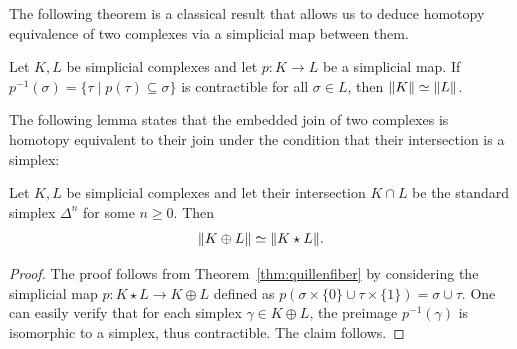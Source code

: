 \documentclass[a4paper, v2021]{lipics-v2021}
\theoremstyle{plain}
\theoremstyle{definition}
\newcommand{\Cliq}[2]{\mathsf{Cliq}_{#1}(#2)}
\DeclarePairedDelimiter{\gr}{\lVert}{\rVert}
\begin{document}
The following theorem is a classical result \cite[Corollary 3.1]{bjornerWW2005} that allows us to deduce homotopy equivalence of two complexes via a simplicial map between them.
\begin{theorem}\label{thm:quillenfiber}
    Let $K, L$ be simplicial complexes and let $p\colon K \to L$ be a simplicial map. If  $p^{-1}(\sigma) = \{ \tau\mid p(\tau) \subseteq \sigma\} $ is contractible for all $\sigma\in L$, then $\gr{K} \simeq \gr{L}$.
\end{theorem}
The following lemma states that the embedded join of two complexes is homotopy equivalent to their join under the condition that their intersection is a simplex:
\begin{lemma}\label{l:joinsimplex}
Let $K,L$ be simplicial complexes and let their intersection $K \cap L$ be the standard simplex $\Delta^n$ for some $n\geq 0$. Then    
\begin{align*}
\gr{K \oplus L} \simeq \gr{K \star L}.
\end{align*}
\end{lemma}
\begin{proof}
The proof follows from Theorem~\ref{thm:quillenfiber} by considering the simplicial map $p\colon K \star L 
\to K \oplus L$ defined as $p(\sigma \times \{0\} \cup \tau \times \{1\}) = \sigma \cup \tau$. One can easily verify that for each simplex $\gamma \in K \oplus L$, the preimage $p^{-1}(\gamma)$ is isomorphic to a simplex, thus contractible. The claim follows.
\end{proof}


\end{document}
